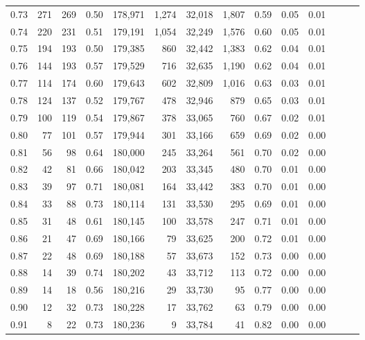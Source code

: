 \begin{tabular}{rrrrrrrrrrrrrr}
0.73 &    271 &    269 &  0.50 &  178,971 &    1,274 &  32,018 &   1,807 &  0.59 &  0.05 &      0.01 \\
0.74 &    220 &    231 &  0.51 &  179,191 &    1,054 &  32,249 &   1,576 &  0.60 &  0.05 &      0.01 \\
0.75 &    194 &    193 &  0.50 &  179,385 &      860 &  32,442 &   1,383 &  0.62 &  0.04 &      0.01 \\
0.76 &    144 &    193 &  0.57 &  179,529 &      716 &  32,635 &   1,190 &  0.62 &  0.04 &      0.01 \\
0.77 &    114 &    174 &  0.60 &  179,643 &      602 &  32,809 &   1,016 &  0.63 &  0.03 &      0.01 \\
0.78 &    124 &    137 &  0.52 &  179,767 &      478 &  32,946 &     879 &  0.65 &  0.03 &      0.01 \\
0.79 &    100 &    119 &  0.54 &  179,867 &      378 &  33,065 &     760 &  0.67 &  0.02 &      0.01 \\
0.80 &     77 &    101 &  0.57 &  179,944 &      301 &  33,166 &     659 &  0.69 &  0.02 &      0.00 \\
0.81 &     56 &     98 &  0.64 &  180,000 &      245 &  33,264 &     561 &  0.70 &  0.02 &      0.00 \\
0.82 &     42 &     81 &  0.66 &  180,042 &      203 &  33,345 &     480 &  0.70 &  0.01 &      0.00 \\
0.83 &     39 &     97 &  0.71 &  180,081 &      164 &  33,442 &     383 &  0.70 &  0.01 &      0.00 \\
0.84 &     33 &     88 &  0.73 &  180,114 &      131 &  33,530 &     295 &  0.69 &  0.01 &      0.00 \\
0.85 &     31 &     48 &  0.61 &  180,145 &      100 &  33,578 &     247 &  0.71 &  0.01 &      0.00 \\
0.86 &     21 &     47 &  0.69 &  180,166 &       79 &  33,625 &     200 &  0.72 &  0.01 &      0.00 \\
0.87 &     22 &     48 &  0.69 &  180,188 &       57 &  33,673 &     152 &  0.73 &  0.00 &      0.00 \\
0.88 &     14 &     39 &  0.74 &  180,202 &       43 &  33,712 &     113 &  0.72 &  0.00 &      0.00 \\
0.89 &     14 &     18 &  0.56 &  180,216 &       29 &  33,730 &      95 &  0.77 &  0.00 &      0.00 \\
0.90 &     12 &     32 &  0.73 &  180,228 &       17 &  33,762 &      63 &  0.79 &  0.00 &      0.00 \\
0.91 &      8 &     22 &  0.73 &  180,236 &        9 &  33,784 &      41 &  0.82 &  0.00 &      0.00 \\

\end{tabular}
